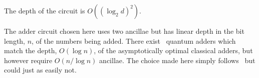 \documentclass[notitlepage]{report}
\theoremstyle{definition}
\begin{document}
The depth of the circuit is $O\left({(\log_{2}d)}^{2}\right)$.

The adder circuit chosen here uses two ancillae but has linear depth in the bit length, $n$, of the numbers being added. There exist~\cite{Takahashi:2008:FQC} quantum adders which match the depth, $O(\log n)$, of the asymptotically optimal classical adders, but however require $O(n/\log n)$ ancillae. The choice made here simply follows~\cite{SHA2} but could just as easily not.



\end{document}

